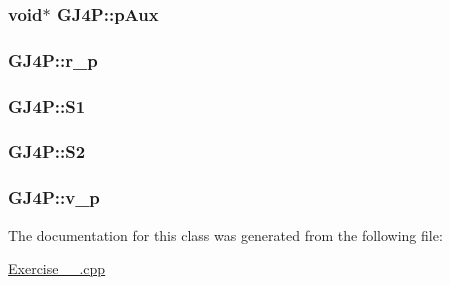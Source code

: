 \hypertarget{classGJ4P_ae919e3fcac68b64836cd15098f5dbf57}{
\subsubsection[{p\-Aux}]{\setlength{\rightskip}{0pt plus 5cm}void$\ast$ G\-J4\-P\-::p\-Aux\hspace{0.3cm}{\ttfamily [private]}}}\label{classGJ4P_ae919e3fcac68b64836cd15098f5dbf57}
\hypertarget{classGJ4P_af7f0a7b35f1a11b509581037c3ce9bad}{
\subsubsection[{r\-\_\-p}]{ G\-J4\-P\-::r\-\_\-p\hspace{0.3cm}{\ttfamily [private]}}}\label{classGJ4P_af7f0a7b35f1a11b509581037c3ce9bad}
\hypertarget{classGJ4P_abeae76a4e3b98e6b27c5cd2014456f23}{
\subsubsection[{S1}]{ G\-J4\-P\-::\-S1\hspace{0.3cm}{\ttfamily [private]}}}\label{classGJ4P_abeae76a4e3b98e6b27c5cd2014456f23}
\hypertarget{classGJ4P_a8f9b87e77a9379c9c2cb4cd8eb96bdb5}{
\subsubsection[{S2}]{ G\-J4\-P\-::\-S2\hspace{0.3cm}{\ttfamily [private]}}}\label{classGJ4P_a8f9b87e77a9379c9c2cb4cd8eb96bdb5}
\hypertarget{classGJ4P_a5ce44c5a2b0b304651c4d463ad440c75}{
\subsubsection[{v\-\_\-p}]{ G\-J4\-P\-::v\-\_\-p\hspace{0.3cm}{\ttfamily [private]}}}\label{classGJ4P_a5ce44c5a2b0b304651c4d463ad440c75}


The documentation for this class was generated from the following file\-:\begin{DoxyCompactItemize}
\item 
\hyperlink{Exercise__4__2_8cpp}{Exercise\-\_\-\_.\-cpp}\end{DoxyCompactItemize}
